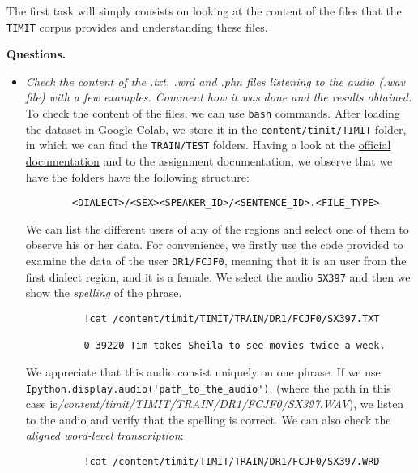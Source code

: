 \documentclass[a4paper]{article}
\def\inline{\lstinline[basicstyle=\ttfamily,keywordstyle={}]}
\begin{document}
The first task will simply consists on looking at the content of the files that the \inline{TIMIT} corpus provides and understanding these files.

\textbf{Questions.}\\

\begin{itemize}
  \item \emph{Check the content of the .txt, .wrd and .phn files listening to the audio (.wav file) with a few examples. Comment how it was done and the results obtained.}\\

        To check the content of the files, we can use \inline{bash} commands. After loading the dataset in Google Colab, we store it in the \inline{content/timit/TIMIT} folder, in which we can find the \inline{TRAIN/TEST} folders. Having a look at the \href{https://catalog.ldc.upenn.edu/LDC93s1}{official documentation} and to the assignment documentation, we observe that we have the folders have the following structure:
        \begin{verbatim}
        <DIALECT>/<SEX><SPEAKER_ID>/<SENTENCE_ID>.<FILE_TYPE>
        \end{verbatim}

        We can list the different users of any of the regions and select one of them to observe his or her data. For convenience, we firstly use the code provided to examine the data of the user \inline{DR1/FCJF0}, meaning that it is an user from the first dialect region, and it is a female. We select the audio \inline{SX397} and then we show the \emph{spelling} of the phrase.

        \begin{verbatim}
          !cat /content/timit/TIMIT/TRAIN/DR1/FCJF0/SX397.TXT

          0 39220 Tim takes Sheila to see movies twice a week.
        \end{verbatim}

        We appreciate that this audio consist uniquely on one phrase. If we use \inline{Ipython.display.audio('path_to_the_audio')}, (where the path in this case is\emph{/content/timit/TIMIT/TRAIN/DR1/FCJF0/SX397.WAV}), we listen to the audio and verify that the spelling is correct. We can also check the \emph{aligned word-level transcription}:

        \begin{verbatim}
          !cat /content/timit/TIMIT/TRAIN/DR1/FCJF0/SX397.WRD


\end{verbatim}
\end{itemize}
\end{document}

